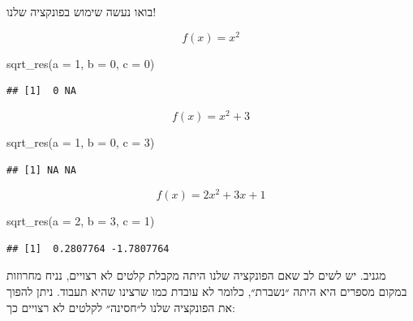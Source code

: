 \documentclass[
]{book}
\newenvironment{Shaded}{\begin{snugshade}}{\end{snugshade}}
\newcommand{\AttributeTok}[1]{\textcolor[rgb]{0.77,0.63,0.00}{#1}}
\newcommand{\DecValTok}[1]{\textcolor[rgb]{0.00,0.00,0.81}{#1}}
\newcommand{\FunctionTok}[1]{\textcolor[rgb]{0.00,0.00,0.00}{#1}}
\newcommand{\NormalTok}[1]{#1}
\begin{document}
בואו נעשה שימוש בפונקציה שלנו!

\[
f(x) = x^2
\]

\begin{Shaded}
\begin{Highlighting}[]
\FunctionTok{sqrt\_res}\NormalTok{(}\AttributeTok{a =} \DecValTok{1}\NormalTok{, }\AttributeTok{b =} \DecValTok{0}\NormalTok{, }\AttributeTok{c =} \DecValTok{0}\NormalTok{)}
\end{Highlighting}
\end{Shaded}

\begin{verbatim}
## [1]  0 NA
\end{verbatim}

\[
f(x) = x^2 + 3
\]

\begin{Shaded}
\begin{Highlighting}[]
\FunctionTok{sqrt\_res}\NormalTok{(}\AttributeTok{a =} \DecValTok{1}\NormalTok{, }\AttributeTok{b =} \DecValTok{0}\NormalTok{, }\AttributeTok{c =} \DecValTok{3}\NormalTok{)}
\end{Highlighting}
\end{Shaded}

\begin{verbatim}
## [1] NA NA
\end{verbatim}

\[
f(x) = 2x^2 + 3x + 1
\]

\begin{Shaded}
\begin{Highlighting}[]
\FunctionTok{sqrt\_res}\NormalTok{(}\AttributeTok{a =} \DecValTok{2}\NormalTok{, }\AttributeTok{b =} \DecValTok{3}\NormalTok{, }\AttributeTok{c =} \DecValTok{1}\NormalTok{)}
\end{Highlighting}
\end{Shaded}

\begin{verbatim}
## [1]  0.2807764 -1.7807764
\end{verbatim}

מגניב.
יש לשים לב שאם הפונקציה שלנו היתה מקבלת קלטים לא רצויים, נניח מחרוזות במקום מספרים היא היתה ״נשברת״, כלומר לא עובדת כמו שרצינו שהיא תעבוד. ניתן להפוך את הפונקציה שלנו ל״חסינה״ לקלטים לא רצויים כך:
\end{document}
